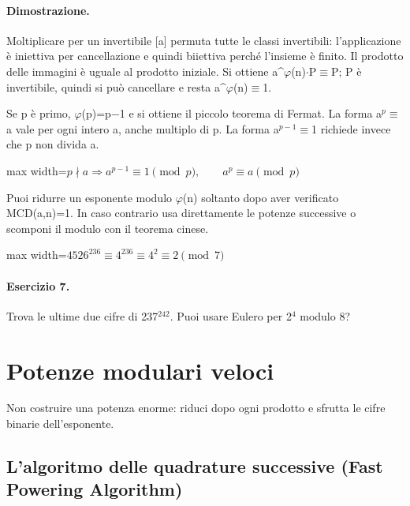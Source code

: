 \documentclass[a4paper,11pt]{article}
\begin{document}
\paragraph{Dimostrazione.} Moltiplicare per un invertibile [a] permuta tutte le classi invertibili: l’applicazione è iniettiva per cancellazione e quindi biiettiva perché l’insieme è finito. Il prodotto delle immagini è uguale al prodotto iniziale. Si ottiene a\textasciicircum{}$\varphi$(n)$\cdot$P$\equiv$P; P è invertibile, quindi si può cancellare e resta a\textasciicircum{}$\varphi$(n)$\equiv$1.

Se p è primo, $\varphi$(p)=p$-$1 e si ottiene il piccolo teorema di Fermat. La forma a$^{p}$$\equiv$a vale per ogni intero a, anche multiplo di p. La forma a$^{p-1}$$\equiv$1 richiede invece che p non divida a.

\begin{center}\begin{adjustbox}{max width=\linewidth}$\displaystyle p\nmid a\Rightarrow a^{p-1}\equiv1\pmod p,\qquad a^p\equiv a\pmod p$\end{adjustbox}\end{center}

Puoi ridurre un esponente modulo $\varphi$(n) soltanto dopo aver verificato MCD(a,n)=1. In caso contrario usa direttamente le potenze successive o scomponi il modulo con il teorema cinese.

\begin{center}\begin{adjustbox}{max width=\linewidth}$\displaystyle 4526^{236}\equiv4^{236}\equiv4^2\equiv2\pmod7$\end{adjustbox}\end{center}

\paragraph{Esercizio 7.} Trova le ultime due cifre di 237$^{242}$. Puoi usare Eulero per 2$^{4}$ modulo 8?

\section{Potenze modulari veloci}

Non costruire una potenza enorme: riduci dopo ogni prodotto e sfrutta le cifre binarie dell’esponente.

\subsection{L’algoritmo delle quadrature successive (Fast Powering Algorithm)}
\end{document}
